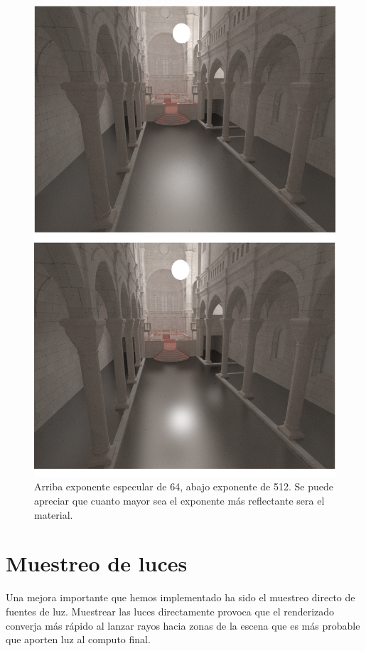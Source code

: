\begin{figure}
\centering
\includegraphics[width=5in]{compare_specular2_burned.png}
\caption{Arriba exponente especular de 64, abajo exponente de 512. Se puede apreciar que cuanto mayor sea el exponente más reflectante sera el material.}
\end{figure}

\clearpage

\section{Muestreo de luces}

Una mejora importante que hemos implementado ha sido el muestreo directo de fuentes de luz. Muestrear las luces directamente provoca que el renderizado converja más rápido al lanzar rayos hacia zonas de la escena que es más probable que aporten luz al computo final.

